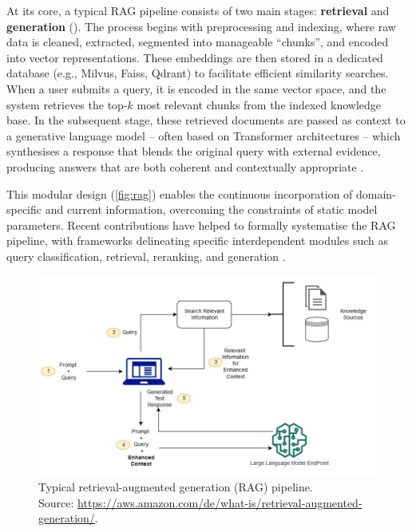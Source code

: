 \begin{spacing}{1.5}
At its core, a typical RAG pipeline consists of two main stages: \textbf{retrieval} and \textbf{generation} (\cite{odsc-community_retrieval-augmented_2024}). The process begins with preprocessing and indexing, where raw data is cleaned, extracted, segmented into manageable ``chunks'', and encoded into vector representations. These embeddings are then stored in a dedicated database (e.g., Milvus, Faiss, Qdrant) to facilitate efficient similarity searches. When a user submits a query, it is encoded in the same vector space, and the system retrieves the top-$k$ most relevant chunks from the indexed knowledge base. In the subsequent stage, these retrieved documents are passed as context to a generative language model -- often based on Transformer architectures \citep{vaswani_attention_2017} -- which synthesises a response that blends the original query with external evidence, producing answers that are both coherent and contextually appropriate \citep{arslan_survey_2024}.

This modular design (\autoref{fig:rag}) enables the continuous incorporation of domain-specific and current information, overcoming the constraints of static model parameters. Recent contributions have helped to formally systematise the RAG pipeline, with frameworks delineating specific interdependent modules such as query classification, retrieval, reranking, and generation \parencite{wang_searching_2024,gao_retrieval-augmented_2024}.

\begin{figure}[H]
  \centering
  \includegraphics[width=\textwidth]{images/rag_workflow.jpg} 
  \caption{Typical retrieval-augmented generation (RAG) pipeline.\\
  \footnotesize{Source: \url{https://aws.amazon.com/de/what-is/retrieval-augmented-generation/}.\nocite{noauthor_was_nodate}}}
  \label{fig:rag}
\end{figure}


\end{spacing}
